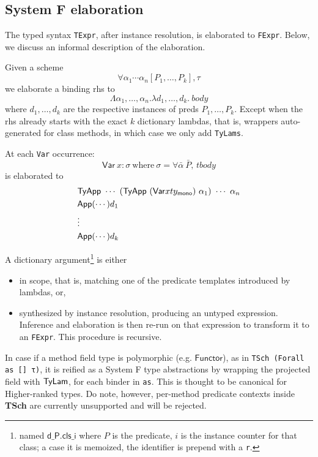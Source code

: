\documentclass[a4paper, 11pt]{article}
\theoremstyle{remark}\newtheorem*{remark}{Remark}
\theoremstyle{definition}\newtheorem*{definition}{Definition}
\begin{document}
\subsection{System F elaboration}
The typed syntax \texttt{TExpr}, after instance resolution, is elaborated to \texttt{FExpr}.
Below, we discuss an informal description of the elaboration.

Given a scheme
\[
\forall \alpha_1 \cdots \alpha_n [P_1, \dots, P_k], \tau
\]
we elaborate a binding rhs to
\[
\Lambda \alpha_1,\dots,\alpha_n.\lambda d_1,\dots,d_k.\ body
\]
where $d_1,\dots,d_k$ are the respective instances of preds $P_1,\dots,P_k$. Except when
the rhs already starts with the exact $k$ dictionary lambdas, that is, wrappers auto-generated for
class methods, in which case we only add \texttt{TyLams}.

At each \texttt{Var} occurrence:
\[
\mathsf{Var}\ x:\sigma\ \mathrm{where}\ \sigma = \forall \bar{\alpha}\ \bar{P},\, tbody
\]
is elaborated to
\begin{align*}
&\Tyapp\ \cdots\ (\Tyapp\ (\FVar x ty_\mathsf{mono})\ \alpha_1)\ \cdots\ \alpha_n\\
&\mathsf{App} (\cdots) d_1\\
&\vdots\\
&\mathsf{App} (\cdots) d_k
\end{align*}

A dictionary argument\footnote{named $\mathsf{d}\_\mathsf{P.cls}\_\mathsf{i}$ where $P$ is the predicate, $i$ is
the instance counter for that class; a case it is memoized, the identifier is prepend with a \texttt{r}.}
is either
\begin{itemize}
\item in scope, that is, matching one of the predicate templates introduced by lambdas, or,
\item synthesized by instance resolution, producing an untyped expression.
  Inference and elaboration is then re-run on that expression to transform it to an \texttt{FExpr}. This
  procedure is recursive.
\end{itemize}
In case if a method field type is polymorphic (e.g. $\mathsf{Functor}$), as in \texttt{TSch (Forall as [] τ)},
it is reified as a
System F type abstractions by wrapping the projected field with $\mathsf{TyLam}$, for each binder in \texttt{as}. This is
thought to be canonical for Higher-ranked types.
Do note, however, per-method predicate contexts inside \textbf{TSch} are currently unsupported and will be
rejected.
\end{document}

